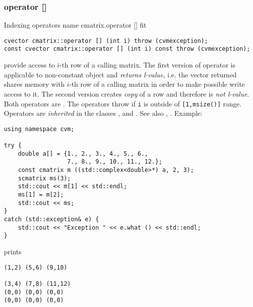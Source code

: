\subsubsection{operator []}
Indexing operators%
\pdfdest name {cmatrix.operator []} fit
\begin{verbatim}
cvector cmatrix::operator [] (int i) throw (cvmexception);
const cvector cmatrix::operator [] (int i) const throw (cvmexception);
\end{verbatim}
provide access to  \hbox{$i$-th} row of a calling matrix. The first version
of operator is applicable to  non-constant object and
\emph{returns  l-value}, i.e. the vector returned shares memory
with \hbox{$i$-th} row of a calling matrix
in order to make possible write access to it.
The second version creates  \emph{copy} of a row and therefore is
\emph{not  l-value}.
Both operators are \Based.
The operators throw 
if \verb"i" is outside of \verb"[1,msize()]" range.
Operators are \emph{inherited}
in the classes
,  
and .
See also ,
.
Example:
\begin{Verbatim}
using namespace cvm;

try {
    double a[] = {1., 2., 3., 4., 5., 6.,
                  7., 8., 9., 10., 11., 12.};
    const cmatrix m ((std::complex<double>*) a, 2, 3);
    scmatrix ms(3);
    std::cout << m[1] << std::endl;
    ms[1] = m[2];
    std::cout << ms;
}
catch (std::exception& e) {
    std::cout << "Exception " << e.what () << std::endl;
}
\end{Verbatim}
prints
\begin{Verbatim}
(1,2) (5,6) (9,10)

(3,4) (7,8) (11,12)
(0,0) (0,0) (0,0)
(0,0) (0,0) (0,0)
\end{Verbatim}
\newpage




